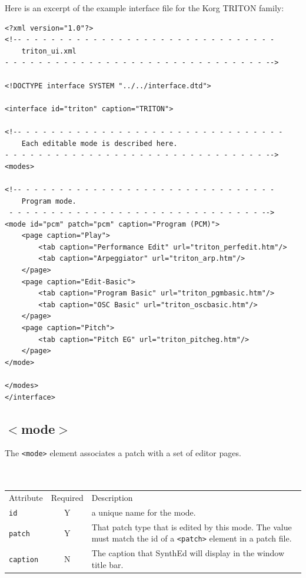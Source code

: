 \documentclass[a4paper,twoside,12pt]{article}
\newcommand{\code}[1]{\color{red}\texttt{#1}\color{black}}
\begin{document}
Here is an excerpt of the example interface file for the
Korg TRITON family: \\
\begin{verbatim}
<?xml version="1.0"?>
<!-- - - - - - - - - - - - - - - - - - - - - - - - - - - - - - -
    triton_ui.xml
- - - - - - - - - - - - - - - - - - - - - - - - - - - - - - - -->

<!DOCTYPE interface SYSTEM "../../interface.dtd">

<interface id="triton" caption="TRITON">

<!-- - - - - - - - - - - - - - - - - - - - - - - - - - - - - - - -
    Each editable mode is described here.
- - - - - - - - - - - - - - - - - - - - - - - - - - - - - - - -->
<modes>

<!-- - - - - - - - - - - - - - - - - - - - - - - - - - - - - - -
    Program mode.
 - - - - - - - - - - - - - - - - - - - - - - - - - - - - - - -->
<mode id="pcm" patch="pcm" caption="Program (PCM)">
    <page caption="Play">
        <tab caption="Performance Edit" url="triton_perfedit.htm"/>
        <tab caption="Arpeggiator" url="triton_arp.htm"/>
    </page>
    <page caption="Edit-Basic">
        <tab caption="Program Basic" url="triton_pgmbasic.htm"/>
        <tab caption="OSC Basic" url="triton_oscbasic.htm"/>
    </page>
    <page caption="Pitch">
        <tab caption="Pitch EG" url="triton_pitcheg.htm"/>
    </page>
</mode>

</modes>
</interface>
\end{verbatim}

\subsection{$<$mode$>$}
The \code{<mode>}{} element associates a patch with a set of
editor pages.
\\
\\
\\
\begin{tabular}{|l|c|p{9cm}|}
\hline
Attribute & Required & Description \\
\code{id} & Y & a unique name for the mode. \\
\code{patch} & Y & That patch type that is edited by this mode.
The value must match the id of a \code{<patch>}{} element in a patch file. \\
\code{caption} & N & The caption that SynthEd will display
in the window title bar. \\
\hline
\end{tabular}
\end{document}
